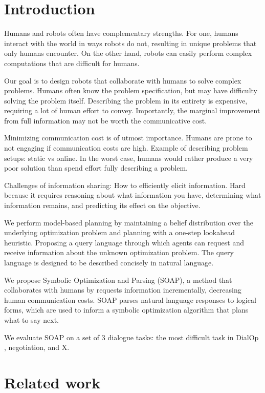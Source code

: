 \documentclass{article}
\newcommand{\method}{SOAP}
\theoremstyle{plain}
\theoremstyle{definition}
\theoremstyle{remark}
\begin{document}
\section{Introduction}
Humans and robots often have complementary strengths.
For one, humans interact with the world in ways robots do not, resulting in unique problems that only humans encounter.
On the other hand, robots can easily perform complex computations that are difficult for humans.

Our goal is to design robots that collaborate with humans to solve complex problems.
Humans often know the problem specification, but may have difficulty solving the problem itself.
Describing the problem in its entirety is expensive, requiring a lot of human effort to convey.
Importantly, the marginal improvement from full information may not be worth the communicative cost.

Minimizing communication cost is of utmost importance.
Humans are prone to not engaging if communication costs are high.
Example of describing problem setups: static vs online.
In the worst case, humans would rather produce a very poor solution than spend effort fully describing a problem.

Challenges of information sharing:
How to efficiently elicit information.
Hard because it requires reasoning about what information you have, determining what information remains, and predicting its effect on the objective.

We perform model-based planning by maintaining a belief distribution over the underlying optimization problem and planning with a one-step lookahead heuristic.
Proposing a query language through which agents can request and receive information about the unknown optimization problem.
The query language is designed to be described concisely in natural language.

We propose Symbolic Optimization and Parsing (\method{}), a method that collaborates with humans by requests information incrementally, decreasing human communication costs.
\method{} parses natural language responses to logical forms, which are used to inform a symbolic optimization algorithm that plans what to say next.

We evaluate \method{} on a set of 3 dialogue tasks: the most difficult task in DialOp \citep{lin2023decision}, negotiation, and X.

\section{Related work}
\end{document}
